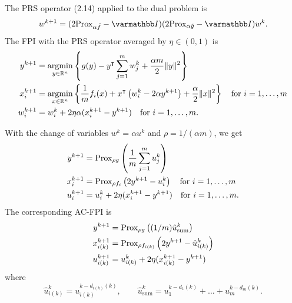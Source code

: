 \documentclass[10pt,mathserif]{beamer}
\begin{document}
\begin{frame}[fragile]

The PRS operator (2.14) applied to the dual problem is
\[
  w^{k+1} = (2\prox_{\alpha \tilde{f}}-\opI)(2\prox_{\alpha \tilde{g}} -\opI)w^k.
\]
The FPI with the PRS operator averaged by $\eta\in(0,1)$ is
\begin{align*}
  y^{k+1} & = \operatorname*{argmin}_{y\in \mathbb{R}^n} \left\{g(y)- y^\intercal\sum_{j=1}^{m}w_j^k  + \frac{\alpha m}{2}\|y\|^2\right\}  \\
  x^{k+1}_{i} & = \operatorname*{argmin}_{x\in \mathbb{R}^n}  \left\{\frac{1}{m}f_{i}(x) + x^\intercal\left(w^k_i-2\alpha y^{k+1}\right) + \frac{\alpha}{2}\|x\|^2  \right\}\quad\text{for }i=1,\dots,m\\
  w^{k+1}_i&=w^k_i+2\eta\alpha(x^{k+1}_i-y^{k+1})\quad\text{for }i=1,\dots,m.
\end{align*}
\end{frame}


\begin{frame}[fragile]
With the change of variables $w^k=\alpha u^k$ and $\rho=1/(\alpha m)$, we get
\begin{align*}
  y^{k+1} & = \mathrm{Prox}_{\rho g}\left(  \frac{1}{ m}\sum_{j=1}^{m}u_j^k  \right)\\
  x^{k+1}_{i} & =\mathrm{Prox}_{\rho f_i}\left(2 y^{k+1}-u^{k}_i \right)\quad\text{for }i=1,\dots,m\\
  u^{k+1}_i&=u^k_i+2\eta(x^{k+1}_i-y^{k+1})\quad\text{for }i=1,\dots,m.
\end{align*}
The corresponding AC-FPI is
\begin{align*}
  y^{k+1} & = \mathrm{Prox}_{\rho g}\left(  (1/m)\hat{u}_\mathrm{sum}^k  \right)\\
  x^{k+1}_{i(k)} & =\mathrm{Prox}_{\rho f_{i(k)}}\left(2 y^{k+1}-\hat{u}^k_{i(k)} \right)\\
  u^{k+1}_{i(k)}&=u^k_{i(k)}+2\eta(x^{k+1}_{i(k)}-y^{k+1})
\end{align*}
where
\[
\hat{u}^k_{i(k)}
=u^{k-d_{i(k)}(k)}_{i(k)},
\qquad
\hat{u}_\mathrm{sum}^k=u_1^{k-d_1(k)}+\dots+u_m^{k-d_m(k)}.
\]
\end{frame}
\end{document}
